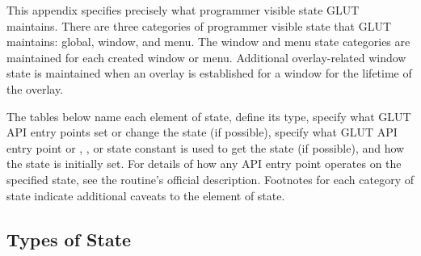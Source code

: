 
This appendix specifies precisely what programmer visible state GLUT
maintains.  There are three categories of programmer visible state that
GLUT maintains:  global, window, and menu.  The window and menu state
categories are maintained for each created window or menu.  
Additional overlay-related window state is maintained when an overlay
is established for a window for the lifetime of the overlay.

The tables below name each element of state, define its type, specify
what GLUT API entry points set or change the state (if possible),
specify what GLUT API entry point or ,
, or  state constant is used to
get the state (if possible), and how the state is initially set.  For
details of how any API entry point operates on the specified state, see
the routine's official description.  Footnotes for each category of
state indicate additional caveats to the element of state.

\subsection{Types of State}

